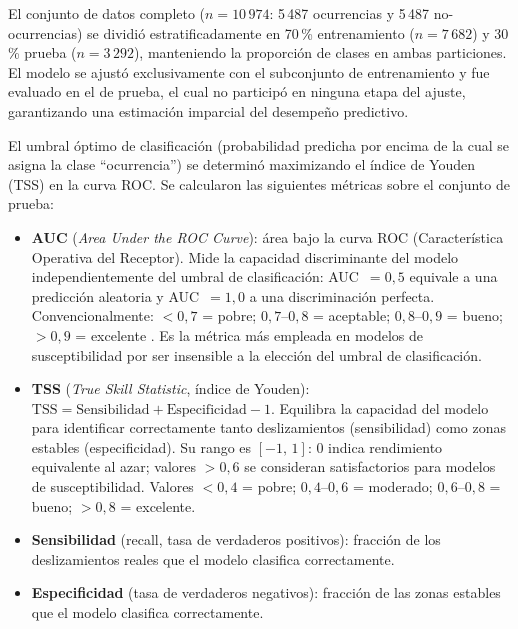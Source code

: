 \documentclass[12pt,a4paper]{article}
\begin{document}
El conjunto de datos completo ($n = 10\,974$: 5\,487 ocurrencias y
5\,487 no-ocurrencias) se dividió estratificadamente en 70\,\%
entrenamiento ($n = 7\,682$) y 30\,\% prueba ($n = 3\,292$),
manteniendo la proporción de clases en ambas particiones. El modelo
se ajustó exclusivamente con el subconjunto de entrenamiento y fue
evaluado en el de prueba, el cual no participó en ninguna etapa del
ajuste, garantizando una estimación imparcial del desempeño predictivo.

El umbral óptimo de clasificación (probabilidad predicha por encima de
la cual se asigna la clase ``ocurrencia'') se determinó maximizando el
índice de Youden (TSS) en la curva ROC. Se calcularon las siguientes
métricas sobre el conjunto de prueba:

\begin{itemize}
    \item \textbf{AUC} (\textit{Area Under the ROC Curve}): área bajo
    la curva ROC (Característica Operativa del Receptor). Mide la
    capacidad discriminante del modelo independientemente del umbral
    de clasificación: AUC~$= 0{,}5$ equivale a una predicción aleatoria
    y AUC~$= 1{,}0$ a una discriminación perfecta. Convencionalmente:
    $<0{,}7$ = pobre; $0{,}7$--$0{,}8$ = aceptable;
    $0{,}8$--$0{,}9$ = bueno; $>0{,}9$ = excelente
    \citep{hosmer2013applied}. Es la métrica más empleada en modelos
    de susceptibilidad por ser insensible a la elección del umbral de
    clasificación.

    \item \textbf{TSS} (\textit{True Skill Statistic}, índice de Youden):
    $\mathrm{TSS} = \mathrm{Sensibilidad} + \mathrm{Especificidad} - 1$.
    Equilibra la capacidad del modelo para identificar correctamente
    tanto deslizamientos (sensibilidad) como zonas estables
    (especificidad). Su rango es $[-1,\,1]$: 0 indica rendimiento
    equivalente al azar; valores $> 0{,}6$ se consideran satisfactorios
    para modelos de susceptibilidad. Valores $<0{,}4$ = pobre;
    $0{,}4$--$0{,}6$ = moderado; $0{,}6$--$0{,}8$ = bueno;
    $>0{,}8$ = excelente.

    \item \textbf{Sensibilidad} (recall, tasa de verdaderos positivos):
    fracción de los deslizamientos reales que el modelo clasifica
    correctamente.

    \item \textbf{Especificidad} (tasa de verdaderos negativos):
    fracción de las zonas estables que el modelo clasifica
    correctamente.


\end{itemize}
\end{document}
